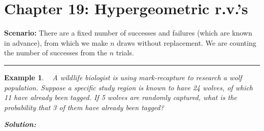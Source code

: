 \documentclass[12pt]{amsart}
\newtheorem{example}[theorem]{Example}
\begin{document}
\setcounter{section}{19}
{\huge  
\section*{Chapter 19: Hypergeometric r.v.'s}
}

{\large 




\vspace{.5cm}

\textbf{Scenario:} There are a fixed number of successes and failures (which are known in advance), from which we make $n$ draws without replacement. We are counting the number of successes from the $n$ trials.

\vspace{.5cm}
\hrule
\vspace{.5cm}


\begin{example}\ %
A wildlife biologist is using mark-recapture to research a wolf population. Suppose a specific study region is known to have 24 wolves,  of which 11 have already been tagged. If 5 wolves are randomly captured, 
what is the probability that 3 of them have already been tagged?


\textbf{Solution:}


\end{example}}
\end{document}
